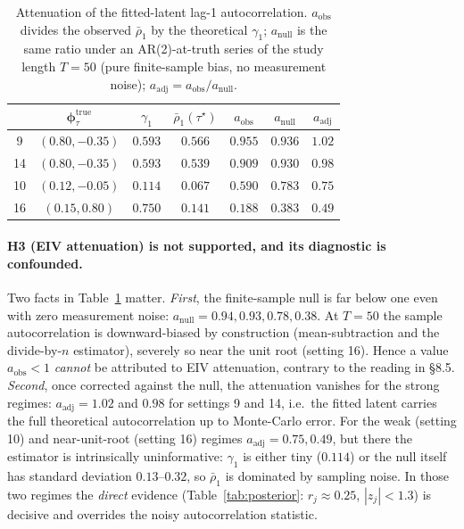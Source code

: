 \documentclass[11pt]{article}
\theoremstyle{definition}
\newcommand{\phitau}{\bm{\phi}_\tau}
\begin{document}
\begin{table}[h]
\centering \small
\renewcommand{\arraystretch}{1.2}
\begin{tabular}{c c c c c c c}
\toprule
& $\phitau^{\text{true}}$ & $\gamma_1$ & $\bar\rho_1(\tau^\star)$
& $a_{\text{obs}}$ & $a_{\text{null}}$ & $a_{\text{adj}}$ \\
\midrule
9  & $(0.80,-0.35)$ & $0.593$ & $0.566$ & $0.955$ & $0.936$ & $1.02$ \\
14 & $(0.80,-0.35)$ & $0.593$ & $0.539$ & $0.909$ & $0.930$ & $0.98$ \\
10 & $(0.12,-0.05)$ & $0.114$ & $0.067$ & $0.590$ & $0.783$ & $0.75$ \\
16 & $(0.15, 0.80)$ & $0.750$ & $0.141$ & $0.188$ & $0.383$ & $0.49$ \\
\bottomrule
\end{tabular}
\caption{Attenuation of the fitted-latent lag-1 autocorrelation. $a_{\text{obs}}$
divides the observed $\bar\rho_1$ by the theoretical $\gamma_1$; $a_{\text{null}}$
is the same ratio under an AR(2)-at-truth series of the study length $T=50$ (pure
finite-sample bias, no measurement noise); $a_{\text{adj}}=a_{\text{obs}}/
a_{\text{null}}$.}
\label{tab:attenuation}
\end{table}

\paragraph{H3 (EIV attenuation) is not supported, and its diagnostic is
confounded.} Two facts in Table~\ref{tab:attenuation} matter.
\emph{First}, the finite-sample null is far below one even with zero measurement
noise: $a_{\text{null}}=0.94,0.93,0.78,0.38$. At $T=50$ the sample autocorrelation
is downward-biased by construction (mean-subtraction and the divide-by-$n$
estimator), severely so near the unit root (setting 16). Hence a value
$a_{\text{obs}}<1$ \emph{cannot} be attributed to EIV attenuation, contrary to the
reading in \S8.5. \emph{Second}, once corrected against the null, the attenuation
vanishes for the strong regimes: $a_{\text{adj}}=1.02$ and $0.98$ for settings 9
and 14, i.e.\ the fitted latent carries the full theoretical autocorrelation up to
Monte-Carlo error. For the weak (setting 10) and near-unit-root (setting 16)
regimes $a_{\text{adj}}=0.75,0.49$, but there the estimator is intrinsically
uninformative: $\gamma_1$ is either tiny ($0.114$) or the null itself has
standard deviation $0.13$--$0.32$, so $\bar\rho_1$ is dominated by sampling
noise. In those two regimes the \emph{direct} evidence
(Table~\ref{tab:posterior}: $r_j\approx0.25$, $|z_j|<1.3$) is decisive and
overrides the noisy autocorrelation statistic.
\end{document}
